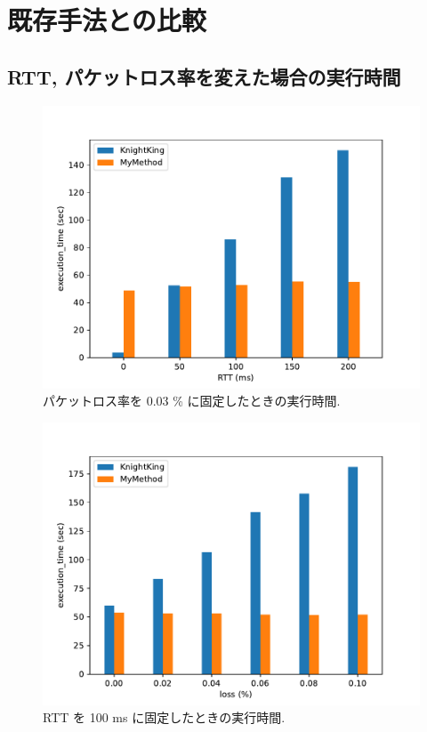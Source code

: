 \section{既存手法との比較}

\subsection{RTT, パケットロス率を変えた場合の実行時間}\label{RTT, パケットロス率を変えた場合の実行時間}

\begin{figure}[t]
    \centering
    \includegraphics[scale=0.8]{figure/Kn_vs_AR_RTT.pdf}
    \caption{パケットロス率を 0.03 \% に固定したときの実行時間.}
    \label{パケットロス率を 0.03 に固定したときの実行時間}
\end{figure}

\begin{figure}[t!]
    \centering
    \includegraphics[scale=0.8]{figure/Kn_vs_AR_loss.pdf}
    \caption{RTT を 100 ms に固定したときの実行時間.}
    \label{RTT を 100 ms に固定したときの実行時間}
\end{figure}

